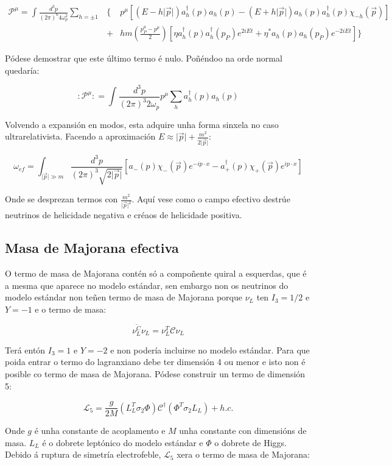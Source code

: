 \documentclass[a4paper,10pt]{article}
\newcommand{\beq}{\begin{equation}}
\newcommand{\eeq}{\end{equation}}
\newcommand{\bea}{\begin{eqnarray}}
\newcommand{\eea}{\end{eqnarray}}
\newcommand{\barra}[1]{\overline{#1}}
\newcommand{\h}[1]{#1^\dagger}
\newcommand{\abs}[1]{\vert #1 \vert}
\newcommand{\rvec}[1]{\overrightarrow{#1}}
\newcommand{\chula}[1]{\mathcal{#1}}
\begin{document}
\bea
\chula P^\mu = \int \frac{d^3p}{(2\pi)^6 4 \omega_p^2} \sum_{h=\pm 1} &\{& p^\mu \left[ (E - h \abs{\rvec p}) \h a_h (p) a_h (p) - (E+h\abs{\rvec p}) a_h (p) \h a_h (p) \chi_{-h} (\rvec p) \right] \nonumber \\
&+& hm \left( \frac{p_P^\mu - p^\mu}{2}\right) \left[ \eta \h a_h (p) \h a_h (p_P) e^{2iEt} + \eta^* a_h (p) a_h (p_P) e^{-2iEt}\right] \}
\eea

Pódese demostrar que este último termo é nulo. Poñéndoo na orde normal quedaría:

\beq
:\chula P^\mu : = \int \frac{d^3p}{(2\pi)^3 2\omega_p} p^\mu \sum_h \h a_h (p) a_h (p)
\eeq

Volvendo a expansión en modos, esta adquire unha forma sinxela no caso ultrarelativista. Facendo a aproximación $ E \approx \abs{\rvec p} + \frac{m^2}{2 \abs{\rvec p}}$:

\beq
\omega_{ef} = \int_{\abs{\rvec p} \gg m} \frac{d^3p}{(2\pi)^3 \sqrt{2 \abs{\rvec p}}} \left[ a_- (p) \chi_- (\rvec p) e^{-i p \cdot x} - \h a_+ (p) \chi_+ (\rvec p) e^{i p \cdot x} \right]
\eeq

Onde se desprezan termos con $\frac{m^2}{\abs{\rvec p}^2}$. Aquí vese como o campo efectivo destrúe neutrinos de helicidade negativa e créaos de helicidade positiva.

\subsection{Masa de Majorana efectiva}

O termo de masa de Majorana contén só a compoñente quiral a esquerdas, que é a mesma que aparece no modelo estándar, sen embargo non os neutrinos do modelo estándar non teñen termo de masa de Majorana porque $\nu_L$ ten $I_3 = 1/2$ e $Y = -1$ e o termo de masa:

\beq
\barra{\nu_L^C} \nu_L = \nu_L^T \chula C \nu_L
\eeq

Terá entón $I_3 = 1$ e $Y = -2$ e non podería incluirse no modelo estándar. Para que poida entrar o termo do lagranxiano debe ter  dimensión 4 ou menor e isto non é posible co termo de masa de Majorana. Pódese construir un termo de dimensión 5:

\beq
\chula L_5 = \frac{g}{2M} \left( L_L^T \sigma_2 \Phi \right) \chula C^\dag \left( \Phi^T \sigma_2 L_L \right) + h.c.
\eeq

Onde $g$ é unha constante de acoplamento e $M$ unha constante con dimensións de masa. $L_L$ é o dobrete leptónico do modelo estándar e $\Phi$ o dobrete de Higgs. Debido á ruptura de simetría electrofeble, $\chula L_5$ xera o termo de masa de Majorana:
\end{document}
